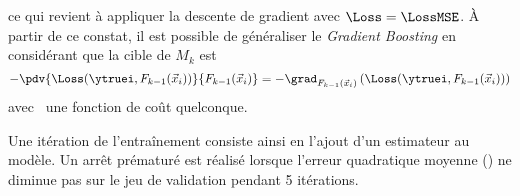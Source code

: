 ce qui revient à appliquer la descente de gradient avec $\Loss=\LossMSE$.
À partir de ce constat,
il est possible de généraliser le \emph{Gradient Boosting}
en considérant que la cible de $M_k$ est
\begin{equation}
- \pdv{\Loss(\ytruei, F_{k-1}(\vec{x}_i))}{F_{k-1}(\vec{x}_i)}
=
- \grad_{F_{k-1}(\vec{x}_i)} \left(\Loss(\ytruei, F_{k-1}(\vec{x}_i))\right)
\end{equation}
avec \Loss\ une fonction de coût quelconque.
\par
Une itération de l'entraînement consiste ainsi en l'ajout d'un estimateur au modèle.
Un arrêt prématuré est réalisé lorsque l'erreur quadratique moyenne (\LossMSE) ne diminue pas sur le jeu de validation pendant 5 itérations.